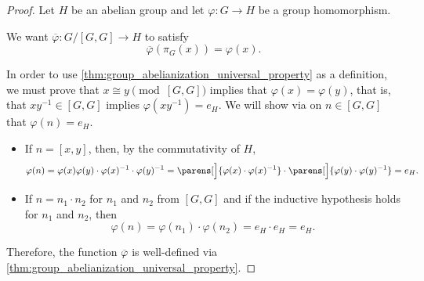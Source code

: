 \begin{proof}
  Let \( H \) be an abelian group and let \( \varphi: G \to H \) be a group homomorphism.

  We want \( \overline{\varphi}: G / [G, G] \to H \) to satisfy
  \begin{equation}
    \overline{\varphi}(\pi_G(x)) = \varphi(x).
  \end{equation}

  In order to use \eqref{thm:group_abelianization_universal_property} as a definition, we must prove that \( x \cong y \pmod {[G, G]} \) implies that \( \varphi(x) = \varphi(y) \), that is, that \( xy^{-1} \in [G, G] \) implies \( \varphi(xy^{-1}) = e_H \). We will show via  on \( n \in [G, G] \) that \( \varphi(n) = e_H \).
  \begin{itemize}
    \item If \( n = [x, y] \), then, by the commutativity of \( H \),
    \begin{equation*}
      \varphi(n)
      =
      \varphi(x) \varphi(y) \cdot \varphi(x)^{-1} \cdot \varphi(y)^{-1}
      =
      \parens[\Big]{ \varphi(x) \cdot \varphi(x)^{-1} } \cdot \parens[\Big]{ \varphi(y) \cdot \varphi(y)^{-1} }
      =
      e_H.
    \end{equation*}

    \item If \( n = n_1 \cdot n_2 \) for \( n_1 \) and \( n_2 \) from \( [G, G] \) and if the inductive hypothesis holds for \( n_1 \) and \( n_2 \), then
    \begin{equation*}
      \varphi(n)
      =
      \varphi(n_1) \cdot \varphi(n_2)
      =
      e_H \cdot e_H
      =
      e_H.
    \end{equation*}
  \end{itemize}

  Therefore, the function \( \overline{\varphi} \) is well-defined via \eqref{thm:group_abelianization_universal_property}.
\end{proof}
